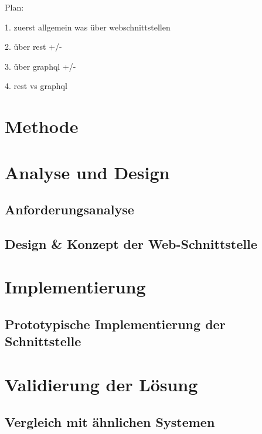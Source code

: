 \documentclass[draft,final]{vutinfth} %
\begin{document}
Plan: 

1. zuerst allgemein was über webschnittstellen
\cite{Investigation_Web-APIs}
\cite{Web-Api-Structures}
\cite{Standardizing_APIs}

2. über rest +/-
\cite{Analysis-of-Rest}

3. über graphql +/-
\cite{Graph_Mapping-Study}

4. rest vs graphql
\cite{Graph_vs_Rest_Implementation}
\cite{Graph_vs_Rest_Performance}

\chapter{Methode}



\chapter{Analyse und Design}

\section{Anforderungsanalyse}

\section{Design \& Konzept der Web-Schnittstelle}



\chapter{Implementierung}

\section{Prototypische Implementierung der Schnittstelle}



\chapter{Validierung der Lösung}

\section{Vergleich mit ähnlichen Systemen}
\end{document}

